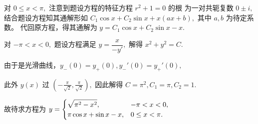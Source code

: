 \begin{answer}[2009T20]{}

    对 $ 0 \leq x < \pi, $ 注意到题设方程的特征方程 $ r^2 + 1 = 0 $ 的根
    为一对共轭复数 $ 0\pm i, $ 结合题设方程知其通解形如 $ C_1\cos x + C_2\sin x + x(ax+b), $ 
    其中 $ a,b $ 为待定系数。
    代回原方程，得其通解为 $ y = C_1\cos x + C_2 \sin x - x.$ 

    对 $ -\pi < x < 0, $ 题设方程满足 $ y = \dfrac{x}{-y'}, $
    解得 $ x^2+y^2 = C. $ 

    由于是光滑曲线，$ y_-(0) = y_+(0), y_-'(0) = y_+'(0), $ 

    此外 $ y(x) $ 过 $ (-\frac{\pi}{\sqrt2},\frac{\pi}{\sqrt2}), $
    因此解得 $ C = \pi^2, C_1 = \pi, C_2 = 1. $ 
    
    故待求方程为 $ y = \begin{cases}
        \displaystyle\sqrt{\pi^2 - x^2},& -\pi < x < 0, \\ 
        \pi \cos x + \sin x - x,& 0\leq x < \pi.
    \end{cases} $ 
\end{answer}

